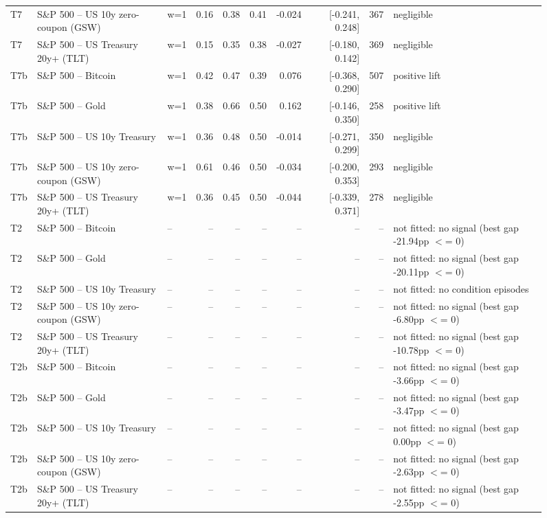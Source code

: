 \begin{figure}
\begin{tabular}{lllrrrrrrl}
T7 & S\&P 500 -- US 10y zero-coupon (GSW) & w=1 & 0.16 & 0.38 & 0.41 & -0.024 & [-0.241, 0.248] & 367 & negligible \\
T7 & S\&P 500 -- US Treasury 20y+ (TLT) & w=1 & 0.15 & 0.35 & 0.38 & -0.027 & [-0.180, 0.142] & 369 & negligible \\
T7b & S\&P 500 -- Bitcoin & w=1 & 0.42 & 0.47 & 0.39 & 0.076 & [-0.368, 0.290] & 507 & positive lift \\
T7b & S\&P 500 -- Gold & w=1 & 0.38 & 0.66 & 0.50 & 0.162 & [-0.146, 0.350] & 258 & positive lift \\
T7b & S\&P 500 -- US 10y Treasury & w=1 & 0.36 & 0.48 & 0.50 & -0.014 & [-0.271, 0.299] & 350 & negligible \\
T7b & S\&P 500 -- US 10y zero-coupon (GSW) & w=1 & 0.61 & 0.46 & 0.50 & -0.034 & [-0.200, 0.353] & 293 & negligible \\
T7b & S\&P 500 -- US Treasury 20y+ (TLT) & w=1 & 0.36 & 0.45 & 0.50 & -0.044 & [-0.339, 0.371] & 278 & negligible \\
T2 & S\&P 500 -- Bitcoin & -- & -- & -- & -- & -- & -- & -- & not fitted: no signal (best gap -21.94pp $<$= 0) \\
T2 & S\&P 500 -- Gold & -- & -- & -- & -- & -- & -- & -- & not fitted: no signal (best gap -20.11pp $<$= 0) \\
T2 & S\&P 500 -- US 10y Treasury & -- & -- & -- & -- & -- & -- & -- & not fitted: no condition episodes \\
T2 & S\&P 500 -- US 10y zero-coupon (GSW) & -- & -- & -- & -- & -- & -- & -- & not fitted: no signal (best gap -6.80pp $<$= 0) \\
T2 & S\&P 500 -- US Treasury 20y+ (TLT) & -- & -- & -- & -- & -- & -- & -- & not fitted: no signal (best gap -10.78pp $<$= 0) \\
T2b & S\&P 500 -- Bitcoin & -- & -- & -- & -- & -- & -- & -- & not fitted: no signal (best gap -3.66pp $<$= 0) \\
T2b & S\&P 500 -- Gold & -- & -- & -- & -- & -- & -- & -- & not fitted: no signal (best gap -3.47pp $<$= 0) \\
T2b & S\&P 500 -- US 10y Treasury & -- & -- & -- & -- & -- & -- & -- & not fitted: no signal (best gap 0.00pp $<$= 0) \\
T2b & S\&P 500 -- US 10y zero-coupon (GSW) & -- & -- & -- & -- & -- & -- & -- & not fitted: no signal (best gap -2.63pp $<$= 0) \\
T2b & S\&P 500 -- US Treasury 20y+ (TLT) & -- & -- & -- & -- & -- & -- & -- & not fitted: no signal (best gap -2.55pp $<$= 0) \\

\end{tabular}
\end{figure}
